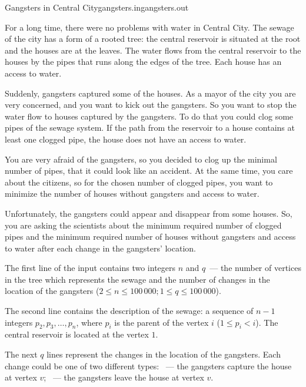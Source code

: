 \begin{problem}{Gangsters in Central City}{gangsters.in}{gangsters.out}{\timeLimit}


For a long time, there were no problems with water in Central City.
The sewage of the city has a form of a rooted tree: the central reservoir
is situated at the root and the houses are at the leaves. 
The water flows from the central reservoir to the houses by 
the pipes that runs along the edges of the tree.
Each house has an access to water.

Suddenly, gangsters captured some of the houses. 
As a mayor of the city you are very concerned, and you want to kick out 
the gangsters.
So you want to stop the water flow to houses captured by the gangsters.
To do that you could clog some pipes of the sewage system.
If the path from the reservoir to a house contains at least one clogged pipe,
the house does not have an access to water.

You are very afraid of the gangsters, so you decided to clog up the 
minimal number of pipes, that it could look like an accident.
At the same time, you care about the citizens, so for the chosen number of
clogged pipes, you want to minimize the number of houses without gangsters and 
access to water.

Unfortunately, the gangsters could appear and disappear from some houses.
So, you are asking the scientists about the minimum required number 
of clogged pipes and the minimum required number of houses without gangsters 
and access to water after each change in the gangsters' location.

\InputFile

The first line of the input contains two integers $n$ and $q$~---
the number of vertices in the tree which represents the sewage and 
the number of changes in the location of the gangsters
($2 \leq n \leq 100\,000; 1 \leq q \leq 100\,000$).

The second line contains the description of the sewage:
a sequence of $n - 1$ integers $p_2, p_3, \ldots, p_n$,
where $p_i$ is the parent of the vertex $i$ ($1 \leq p_i < i$). 
The central reservoir is located at the vertex $1$.

The next $q$ lines represent the changes in the location of the gangsters. 
Each change could be one of two different types:
~--- the gangsters capture the house at vertex $v$;
~--- the gangsters leave the house at vertex $v$.


\end{problem}
